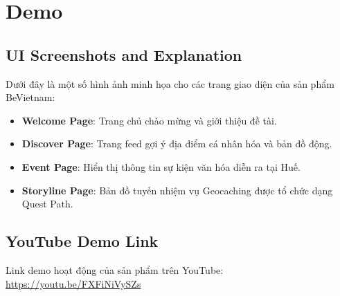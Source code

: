 \section{Demo}

\subsection{UI Screenshots and Explanation}

Dưới đây là một số hình ảnh minh họa cho các trang giao diện của sản phẩm BeVietnam:
\begin{itemize}
    \item \textbf{Welcome Page}: Trang chủ chào mừng và giới thiệu đề tài.
    \item \textbf{Discover Page}: Trang feed gợi ý địa điểm cá nhân hóa và bản đồ động.
    \item \textbf{Event Page}: Hiển thị thông tin sự kiện văn hóa diễn ra tại Huế.
    \item \textbf{Storyline Page}: Bản đồ tuyến nhiệm vụ Geocaching được tổ chức dạng Quest Path.
\end{itemize}

\subsection{YouTube Demo Link}

Link demo hoạt động của sản phẩm trên YouTube: \url{https://youtu.be/FXFiNiVySZs}
